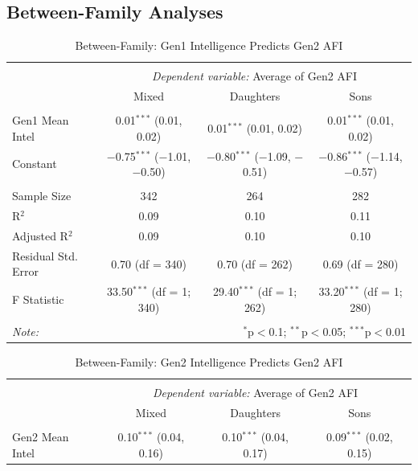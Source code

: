 \documentclass[a4paper,man,apacite,natbib,12pt,longtable]{apa6}\usepackage[]{graphicx}\usepackage[]{color}
\begin{document}
\begin{landscape}
  \subsection{Between-Family Analyses}
  \begin{longtable}{@{\extracolsep{5pt}}lccc} 
  \caption{Between-Family: Gen1 Intelligence Predicts Gen2 AFI} \label{table_Mean_Mom_Intelligence_Mean_Child_AFI_10}
  \\[-1.8ex]\hline 
  \hline \\[-3.8ex] 
  & \multicolumn{3}{c}{\textit{Dependent variable:} Average of Gen2 AFI} \\ 
  \cline{2-4}
 & Mixed & Daughters & Sons \\ 
\hline \\[-1.8ex] 
 Gen1 Mean Intel & 0.01$^{***}$ (0.01, 0.02) & 0.01$^{***}$ (0.01, 0.02) & 0.01$^{***}$ (0.01, 0.02) \\ 
  Constant & $-$0.75$^{***}$ ($-$1.01, $-$0.50) & $-$0.80$^{***}$ ($-$1.09, $-$0.51) & $-$0.86$^{***}$ ($-$1.14, $-$0.57) \\ 
 \hline \\[-1.8ex] 
Sample Size & 342 & 264 & 282 \\ 
R$^{2}$ & 0.09 & 0.10 & 0.11 \\ 
Adjusted R$^{2}$ & 0.09 & 0.10 & 0.10 \\ 
Residual Std. Error & 0.70 (df = 340) & 0.70 (df = 262) & 0.69 (df = 280) \\ 
F Statistic & 33.50$^{***}$ (df = 1; 340) & 29.40$^{***}$ (df = 1; 262) & 33.20$^{***}$ (df = 1; 280) \\ 
\hline 
\hline \\[-1.8ex] 
\textit{Note:}  & \multicolumn{3}{r}{$^{*}$p$<$0.1; $^{**}$p$<$0.05; $^{***}$p$<$0.01} \\ 
  \end{longtable}\pagebreak
  \begin{longtable}{@{\extracolsep{5pt}}lccc} 
  \caption{Between-Family: Gen2 Intelligence Predicts Gen2 AFI} \label{table_Mean_Child_Intelligence_Mean_Child_AFI_10}
  \\[-1.8ex]\hline 
  \hline \\[-3.8ex] 
  & \multicolumn{3}{c}{\textit{Dependent variable:} Average of Gen2 AFI} \\ 
  \cline{2-4}
 & Mixed & Daughters & Sons \\ 
\hline \\[-1.8ex] 
 Gen2 Mean Intel & 0.10$^{***}$ (0.04, 0.16) & 0.10$^{***}$ (0.04, 0.17) & 0.09$^{***}$ (0.02, 0.15) \\ 

\end{longtable}
\end{landscape}
\end{document}

